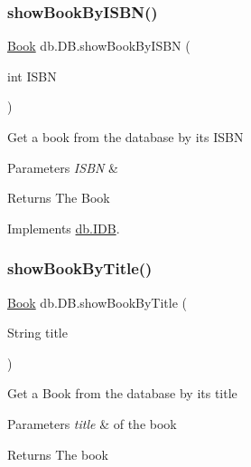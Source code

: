 \mbox{\label{classdb_1_1_d_b_ae902ce95ca7433f1f7f77419f4121f4c}} 
\subsubsection{\texorpdfstring{show\+Book\+By\+I\+S\+B\+N()}{showBookByISBN()}}
{\footnotesize\ttfamily \hyperlink{classserver_1_1data_1_1_book}{Book} db.\+D\+B.\+show\+Book\+By\+I\+S\+BN (\begin{DoxyParamCaption}\item[{int}]{I\+S\+BN }\end{DoxyParamCaption})}

Get a book from the database by its I\+S\+BN 
\begin{DoxyParams}{Parameters}
{\em I\+S\+BN} & \\
\hline
\end{DoxyParams}
\begin{DoxyReturn}{Returns}
The Book 
\end{DoxyReturn}


Implements \hyperlink{interfacedb_1_1_i_d_b_aed305f6c36ff140084636a8eded479db}{db.\+I\+DB}.

\mbox{\label{classdb_1_1_d_b_a22a4c5b98facd4506b03828697220773}} 
\subsubsection{\texorpdfstring{show\+Book\+By\+Title()}{showBookByTitle()}}
{\footnotesize\ttfamily \hyperlink{classserver_1_1data_1_1_book}{Book} db.\+D\+B.\+show\+Book\+By\+Title (\begin{DoxyParamCaption}\item[{String}]{title }\end{DoxyParamCaption})}

Get a Book from the database by its title 
\begin{DoxyParams}{Parameters}
{\em title} & of the book \\
\hline
\end{DoxyParams}
\begin{DoxyReturn}{Returns}
The book 
\end{DoxyReturn}


